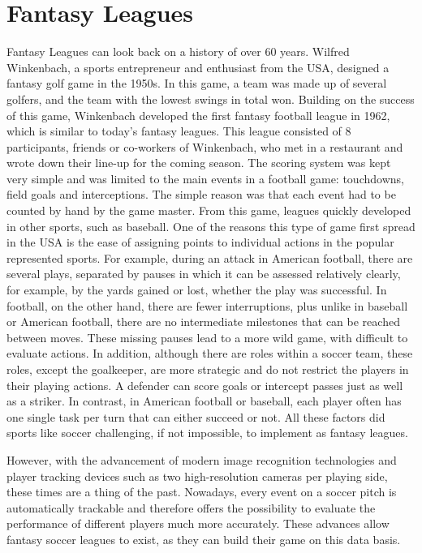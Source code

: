 \section{Fantasy Leagues}

Fantasy Leagues can look back on a history of over 60 years. Wilfred Winkenbach, a sports entrepreneur and enthusiast from the USA, designed a fantasy golf game in the 1950s. In this game, a team was made up of several golfers, and the team with the lowest swings in total won. Building on the success of this game, Winkenbach developed the first fantasy football league in 1962, which is similar to today's fantasy leagues. \parencite[cf.][]{green_wink_2014} This league consisted of 8 participants, friends or co-workers of Winkenbach, who met in a restaurant and wrote down their line-up for the coming season. The scoring system was kept very simple and was limited to the main events in a football game: touchdowns, field goals and interceptions. The simple reason was that each event had to be counted by hand by the game master. \parencite[cf.][]{fabiano_fantasy_2007} From this game, leagues quickly developed in other sports, such as baseball. One of the reasons this type of game first spread in the USA is the ease of assigning points to individual actions in the popular represented sports. For example, during an attack in American football, there are several plays, separated by pauses in which it can be assessed relatively clearly, for example, by the yards gained or lost, whether the play was successful. In football, on the other hand, there are fewer interruptions, plus unlike in baseball or American football, there are no intermediate milestones that can be reached between moves. These missing pauses lead to a more wild game, with difficult to evaluate actions. In addition, although there are roles within a soccer team, these roles, except the goalkeeper, are more strategic and do not restrict the players in their playing actions. A defender can score goals or intercept passes just as well as a striker. In contrast, in American football or baseball, each player often has one single task per turn that can either succeed or not. All these factors did sports like soccer challenging, if not impossible, to implement as fantasy leagues.

However, with the advancement of modern image recognition technologies and player tracking devices such as two high-resolution cameras per playing side, these times are a thing of the past. \parencite[cf.][]{hoffmann_millionen_2014} Nowadays, every event on a soccer pitch is automatically trackable and therefore offers the possibility to evaluate the performance of different players much more accurately. These advances allow fantasy soccer leagues to exist, as they can build their game on this data basis.

